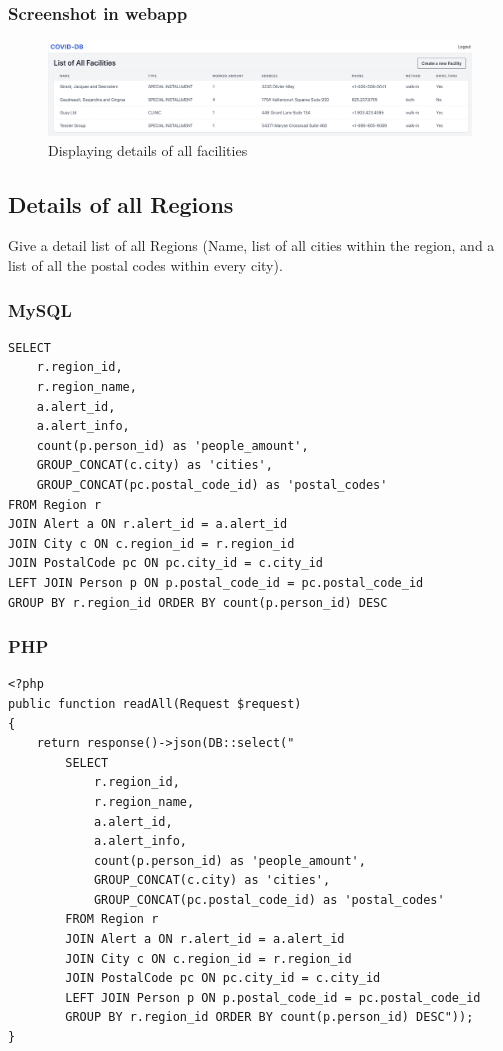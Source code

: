 \subsubsection{Screenshot in webapp}

\begin{figure}[H]
    \centering
    \includegraphics[scale=0.32]{imgs/allfacilities.png}
    \caption{Displaying details of all facilities}
\end{figure}

\subsection{Details of all Regions}
Give a detail list of all Regions (Name, list of all cities within the region,
and a list of all the postal codes within every city). 


\subsubsection{MySQL}
\begin{verbatim}
SELECT
    r.region_id,
    r.region_name,
    a.alert_id,
    a.alert_info,
    count(p.person_id) as 'people_amount',
    GROUP_CONCAT(c.city) as 'cities',
    GROUP_CONCAT(pc.postal_code_id) as 'postal_codes'
FROM Region r
JOIN Alert a ON r.alert_id = a.alert_id
JOIN City c ON c.region_id = r.region_id
JOIN PostalCode pc ON pc.city_id = c.city_id
LEFT JOIN Person p ON p.postal_code_id = pc.postal_code_id
GROUP BY r.region_id ORDER BY count(p.person_id) DESC
\end{verbatim}

\subsubsection{PHP}
\begin{verbatim}
<?php
public function readAll(Request $request)
{
    return response()->json(DB::select("
        SELECT
            r.region_id,
            r.region_name,
            a.alert_id,
            a.alert_info,
            count(p.person_id) as 'people_amount',
            GROUP_CONCAT(c.city) as 'cities',
            GROUP_CONCAT(pc.postal_code_id) as 'postal_codes'
        FROM Region r
        JOIN Alert a ON r.alert_id = a.alert_id
        JOIN City c ON c.region_id = r.region_id
        JOIN PostalCode pc ON pc.city_id = c.city_id
        LEFT JOIN Person p ON p.postal_code_id = pc.postal_code_id
        GROUP BY r.region_id ORDER BY count(p.person_id) DESC"));
}

\end{verbatim}

